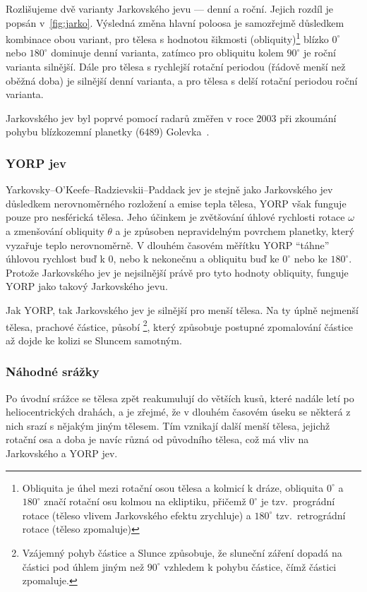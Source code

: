\documentclass[A4paper, 12pt, oneside]{book}
\begin{document}
Rozlišujeme dvě varianty Jarkovského jevu --- denní a roční. Jejich rozdíl je popsán v~\ref{fig:jarko}. Výsledná změna hlavní poloosa je samozřejmě důsledkem kombinace obou variant, pro tělesa s hodnotou šikmosti (obliquity)\footnote{Obliquita je úhel mezi rotační osou tělesa a kolmicí k dráze, obliquita $0^\circ$ a $180^\circ$ značí rotační osu kolmou na ekliptiku, přičemž $0^\circ$ je tzv.\ prográdní rotace (těleso vlivem Jarkovského efektu zrychluje) a $180^\circ$ tzv.\ retrográdní rotace (těleso zpomaluje)} blízko $0^\circ$ nebo $180^\circ$ dominuje denní varianta, zatímco pro obliquitu kolem $90^\circ$ je roční varianta silnější. Dále pro tělesa s rychlejší rotační periodou (řádově menší než oběžná doba) je silnější denní varianta, a pro tělesa s delší rotační periodou roční varianta. 

Jarkovského jev byl poprvé pomocí radarů změřen v roce 2003 při zkoumání pohybu blízkozemní planetky (6489) Golevka~\cite{chesley03}.
\subsubsection{YORP jev}

Yarkovsky–O'Keefe–Radzievskii–Paddack jev je stejně jako Jarkovského jev důsledkem nerovnoměrného rozložení a emise tepla tělesa, YORP však funguje pouze pro nesférická tělesa. Jeho účinkem je zvětšování úhlové rychlosti rotace $\omega$ a zmenšování obliquity $\theta$ a je způsoben nepravidelným povrchem planetky, který vyzařuje teplo nerovnoměrně. V dlouhém časovém měřítku YORP \enquote{táhne} úhlovou rychlost buď k $0$, nebo k nekonečnu a obliquitu buď ke $0^\circ$ nebo ke $180^\circ$. Protože Jarkovského jev je nejsilnější právě pro tyto hodnoty obliquity, funguje YORP jako takový  Jarkovského jevu. 

Jak YORP, tak Jarkovského jev je silnější pro menší tělesa. Na ty úplně nejmenší tělesa, prachové částice, působí \footnote{Vzájemný pohyb částice a Slunce způsobuje, že sluneční záření dopadá na částici pod úhlem jiným než $90^\circ$ vzhledem k pohybu částice, čímž částici zpomaluje.}, který způsobuje postupné zpomalování částice až dojde ke kolizi se Sluncem samotným. 

\subsubsection{Náhodné srážky}
Po úvodní srážce se tělesa zpět reakumulují do větších kusů, které nadále letí po heliocentrických drahách, a je zřejmé, že v dlouhém časovém úseku se některá z nich srazí s nějakým jiným tělesem. Tím vznikají další menší tělesa, jejichž rotační osa a doba je navíc různá od původního tělesa, což má vliv na Jarkovského a YORP jev. 
\end{document}

